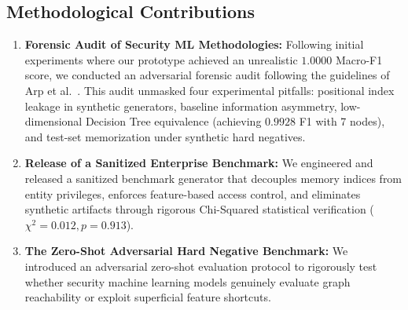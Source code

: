 \subsection{Methodological Contributions}
\begin{enumerate}
    \item \textbf{Forensic Audit of Security ML Methodologies:} Following initial experiments where our prototype achieved an unrealistic $1.0000$ Macro-F1 score, we conducted an adversarial forensic audit following the guidelines of Arp et al.~\cite{arp2022dos}. This audit unmasked four experimental pitfalls: positional index leakage in synthetic generators, baseline information asymmetry, low-dimensional Decision Tree equivalence (achieving $0.9928$ F1 with 7 nodes), and test-set memorization under synthetic hard negatives.
    \item \textbf{Release of a Sanitized Enterprise Benchmark:} We engineered and released a sanitized benchmark generator that decouples memory indices from entity privileges, enforces feature-based access control, and eliminates synthetic artifacts through rigorous Chi-Squared statistical verification ($\chi^2 = 0.012, p = 0.913$).
    \item \textbf{The Zero-Shot Adversarial Hard Negative Benchmark:} We introduced an adversarial zero-shot evaluation protocol to rigorously test whether security machine learning models genuinely evaluate graph reachability or exploit superficial feature shortcuts.
\end{enumerate}

